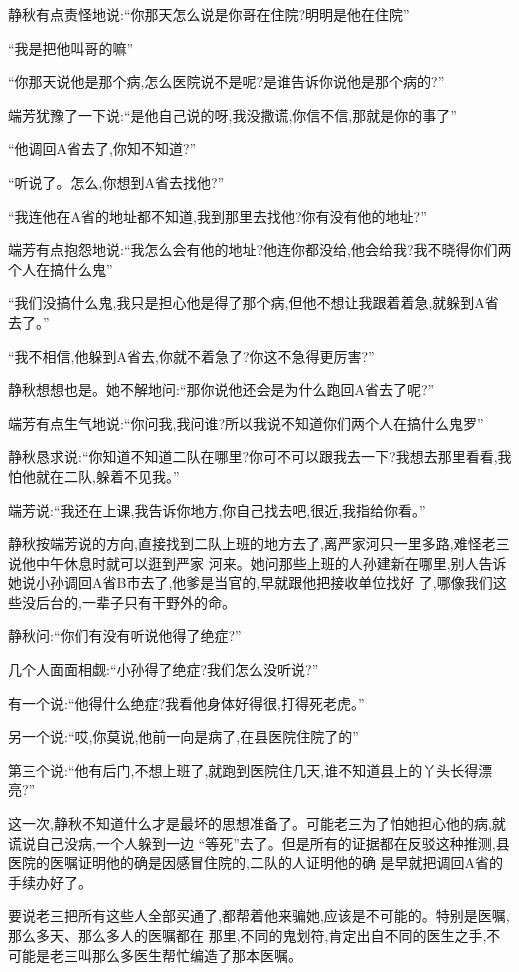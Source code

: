 ﻿\documentclass[12pt]{article}
\begin{document}
静秋有点责怪地说:``你那天怎么说是你哥在住院?明明是\myrule 他在住院\myrule ''

``我是把他叫哥的嘛\myrule ''

``你那天说他是\myrule 那个病,怎么医院说不是呢?是谁告诉你说他是\myrule 那个病的?''

端芳犹豫了一下说:``是他自己说的呀,我没撒谎,你信不信,那就是你的事了\myrule ''

``他调回A省去了,你知不知道?''

``听说了。怎么,你想到A省去找他?''

``我连他在A省的地址都不知道,我到那里去找他?你有没有他的地址?''

端芳有点抱怨地说:``我怎么会有他的地址?他连你都没给,他会给我?我不晓得你们两个人在搞什么鬼\myrule ''

``我们没搞什么鬼,我只是担心他是得了那个病,但他不想让我跟着着急,就躲到A省去了。''

``我不相信,他躲到A省去,你就不着急了?你这不急得更厉害?''

静秋想想也是。她不解地问:``那你说他还会是为什么跑回A省去了呢?''

端芳有点生气地说:``你问我,我问谁?所以我说不知道你们两个人在搞什么鬼罗\myrule ''

静秋恳求说:``你知道不知道二队在哪里?你可不可以跟我去一下?我想去那里看看,我怕他就在二队,躲着不见我。''

端芳说:``我还在上课\myrule ,我告诉你地方,你自己找去吧,很近,我指给你看。''

静秋按端芳说的方向,直接找到二队上班的地方去了,离严家河只一里多路,难怪老三说他中午休息时就可以逛到严家
河来。她问那些上班的人孙建新在哪里,别人告诉她说小孙调回A省B市去了,他爹是当官的,早就跟他把接收单位找好
了,哪像我们这些没后台的,一辈子只有干野外的命。

静秋问:``你们有没有听说他\myrule 得了\myrule 绝症?''

几个人面面相觑:``小孙得了绝症?我们怎么没听说?''

有一个说:``他得什么绝症?我看他身体好得很,打得死老虎。''

另一个说:``哎,你莫说,他前一向是病了,在县医院住院了的\myrule ''

第三个说:``他有后门,不想上班了,就跑到医院住几天,谁不知道县上的丫头长得漂亮?''
 
这一次,静秋不知道什么才是最坏的思想准备了。可能老三为了怕她担心他的病,就谎说自己没病,一个人躲到一边
``等死''去了。但是所有的证据都在反驳这种推测,县医院的医嘱证明他的确是因感冒住院的,二队的人证明他的确
是早就把调回A省的手续办好了。

要说老三把所有这些人全部买通了,都帮着他来骗她,应该是不可能的。特别是医嘱,那么多天、那么多人的医嘱都在
那里,不同的鬼划符,肯定出自不同的医生之手,不可能是老三叫那么多医生帮忙编造了那本医嘱。
\end{document}
